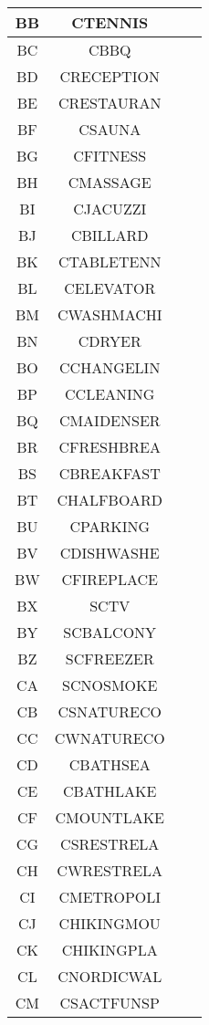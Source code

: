 \begin{longtable}{ | c | c | c | c |}
	BB & CTENNIS &  \\ \hline 
	BC & CBBQ &  \\ \hline 
	BD & CRECEPTION&  \\ \hline 
	BE & CRESTAURAN &  \\ \hline 
	BF & CSAUNA &  \\ \hline 
	BG & CFITNESS &  \\ \hline 
	BH & CMASSAGE &  \\ \hline 
	BI & CJACUZZI&  \\ \hline 
	BJ & CBILLARD &  \\ \hline 
	BK & CTABLETENN &  \\ \hline 
	BL & CELEVATOR &  \\ \hline 
	BM & CWASHMACHI &  \\ \hline 
	BN & CDRYER &  \\ \hline 
	BO & CCHANGELIN &  \\ \hline 
	BP & CCLEANING &  \\ \hline 
	BQ & CMAIDENSER &  \\ \hline 
	BR & CFRESHBREA &  \\ \hline 
	BS & CBREAKFAST &  \\ \hline 
	BT & CHALFBOARD &  \\ \hline 
	BU & CPARKING &  \\ \hline 
	BV & CDISHWASHE &  \\ \hline 
	BW & CFIREPLACE &  \\ \hline 
	BX & SCTV &  \\ \hline 
	BY & SCBALCONY &  \\ \hline 
	BZ & SCFREEZER &  \\ \hline 
	CA & SCNOSMOKE &  \\ \hline 
	CB & CSNATURECO &  \\ \hline 
	CC & CWNATURECO &  \\ \hline 
	CD & CBATHSEA &  \\ \hline 
	CE & CBATHLAKE &  \\ \hline 
	CF & CMOUNTLAKE &  \\ \hline 
	CG & CSRESTRELA &  \\ \hline 
	CH & CWRESTRELA &  \\ \hline 
	CI & CMETROPOLI &  \\ \hline 
	CJ & CHIKINGMOU &  \\ \hline 
	CK & CHIKINGPLA&  \\ \hline 
	CL & CNORDICWAL &  \\ \hline 
	CM & CSACTFUNSP &  \\ \hline 

\end{longtable}
